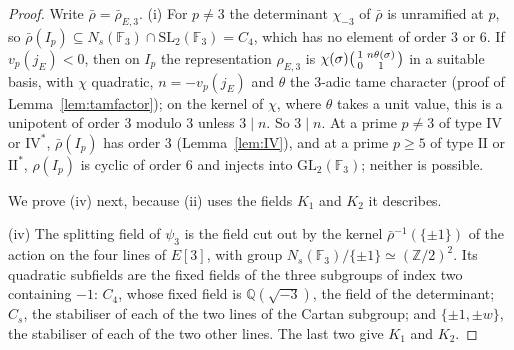 \documentclass[11pt]{amsart}
\theoremstyle{definition}
\newcommand{\Q}{\mathbb{Q}}
\newcommand{\Z}{\mathbb{Z}}
\newcommand{\F}{\mathbb{F}}
\newcommand{\SL}{\mathrm{SL}}
\newcommand{\GL}{\mathrm{GL}}
\begin{document}
\begin{proof}
Write $\bar\rho=\bar\rho_{E,3}$. (i) For $p\ne3$ the determinant $\chi_{-3}$ of $\bar\rho$ is unramified at $p$, so $\bar\rho(I_p)\subseteq N_s(\F_3)\cap\SL_2(\F_3)=C_4$, which has no element of order $3$ or $6$. If $v_p(j_E)<0$, then on $I_p$ the representation $\rho_{E,3}$ is $\chi(\sigma)\begin{psmallmatrix}1&n\theta(\sigma)\\0&1\end{psmallmatrix}$ in a suitable basis, with $\chi$ quadratic, $n=-v_p(j_E)$ and $\theta$ the $3$-adic tame character (proof of Lemma~\ref{lem:tamfactor}); on the kernel of $\chi$, where $\theta$ takes a unit value, this is a unipotent of order $3$ modulo $3$ unless $3\mid n$. So $3\mid n$. At a prime $p\ne3$ of type $\mathrm{IV}$ or $\mathrm{IV}^*$, $\bar\rho(I_p)$ has order $3$ (Lemma~\ref{lem:IV}), and at a prime $p\ge5$ of type $\mathrm{II}$ or $\mathrm{II}^*$, $\rho(I_p)$ is cyclic of order $6$ \cite{Kraus90} and injects into $\GL_2(\F_3)$; neither is possible.

We prove (iv) next, because (ii) uses the fields $K_1$ and $K_2$ it describes.

(iv) The splitting field of $\psi_3$ is the field cut out by the kernel $\bar\rho^{-1}(\{\pm1\})$ of the action on the four lines of $E[3]$, with group $N_s(\F_3)/\{\pm1\}\simeq(\Z/2)^2$. Its quadratic subfields are the fixed fields of the three subgroups of index two containing $-1$: $C_4$, whose fixed field is $\Q(\sqrt{-3})$, the field of the determinant; $C_s$, the stabiliser of each of the two lines of the Cartan subgroup; and $\{\pm1,\pm w\}$, the stabiliser of each of the two other lines. The last two give $K_1$ and $K_2$.


\end{proof}
\end{document}
